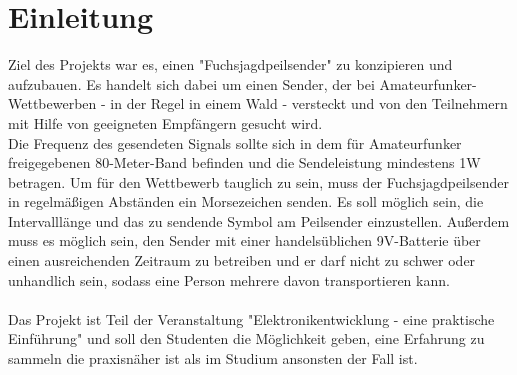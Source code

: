 \section{Einleitung}
Ziel des Projekts war es, einen "Fuchsjagdpeilsender" zu konzipieren und aufzubauen. Es handelt sich dabei um einen Sender, der bei Amateurfunker-Wettbewerben - in der Regel in einem Wald - versteckt und von den Teilnehmern mit Hilfe von geeigneten Empfängern gesucht wird.\\
Die Frequenz des gesendeten Signals sollte sich in dem für Amateurfunker freigegebenen 80-Meter-Band befinden und die Sendeleistung mindestens 1W betragen. Um für den Wettbewerb tauglich zu sein, muss der Fuchsjagdpeilsender in regelmäßigen Abständen ein Morsezeichen senden. Es soll möglich sein, die Intervalllänge und das zu sendende Symbol am Peilsender einzustellen. Außerdem muss es möglich sein, den Sender mit einer handelsüblichen 9V-Batterie über einen ausreichenden Zeitraum zu betreiben und er darf nicht zu schwer oder unhandlich sein, sodass eine Person mehrere davon transportieren kann. \\\\
Das Projekt ist Teil der Veranstaltung "Elektronikentwicklung - eine praktische Einführung" und soll den Studenten die Möglichkeit geben, eine Erfahrung zu sammeln die praxisnäher ist als im Studium ansonsten der Fall ist.